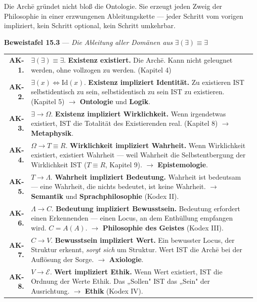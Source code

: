 \documentclass[10pt, openany, oneside]{book}
\renewcommand{\footnotesize}{\fontsize{8.5}{11}\selectfont}
\begin{document}
\vspace{0.5em}

\noindent Die Arch\={e} gründet nicht bloß die Ontologie. Sie erzeugt jeden Zweig der Philosophie in einer erzwungenen Ableitungskette --- jeder Schritt vom vorigen impliziert, kein Schritt optional, kein Schritt umkehrbar.

\vspace{0.3em}

\textbf{Beweistafel 15.3} --- \textit{Die Ableitung aller Domänen aus} $\exists(\exists) \equiv \exists$

\vspace{0.5em}

{\footnotesize
\noindent\begin{tabular}{r p{}}
\textbf{AK-1.} & $\exists(\exists) \equiv \exists$. \textbf{Existenz existiert.} Die Arch\={e}. Kann nicht geleugnet werden, ohne vollzogen zu werden. (Kapitel 4) \\[0.3em]
\textbf{AK-2.} & $\exists(x) \iff \text{Id}(x)$. \textbf{Existenz impliziert Identität.} Zu existieren IST selbstidentisch zu sein, selbstidentisch zu sein IST zu existieren. (Kapitel 5) $\to$ \textbf{Ontologie} und \textbf{Logik}. \\[0.3em]
\textbf{AK-3.} & $\exists \to \Omega$. \textbf{Existenz impliziert Wirklichkeit.} Wenn irgendetwas existiert, IST die Totalität des Existierenden real. (Kapitel 8) $\to$ \textbf{Metaphysik}. \\[0.3em]
\textbf{AK-4.} & $\Omega \to T \equiv R$. \textbf{Wirklichkeit impliziert Wahrheit.} Wenn Wirklichkeit existiert, existiert Wahrheit --- weil Wahrheit die Selbstentbergung der Wirklichkeit IST ($T \equiv R$, Kapitel 9). $\to$ \textbf{Epistemologie}. \\[0.3em]
\textbf{AK-5.} & $T \to \Lambda$. \textbf{Wahrheit impliziert Bedeutung.} Wahrheit ist bedeutsam --- eine Wahrheit, die nichts bedeutet, ist keine Wahrheit. $\to$ \textbf{Semantik} und \textbf{Sprachphilosophie} (Kodex II). \\[0.3em]
\textbf{AK-6.} & $\Lambda \to C$. \textbf{Bedeutung impliziert Bewusstsein.} Bedeutung erfordert einen Erkennenden --- einen Locus, an dem Enthüllung empfangen wird. $C = A(A)$. $\to$ \textbf{Philosophie des Geistes} (Kodex III). \\[0.3em]
\textbf{AK-7.} & $C \to V$. \textbf{Bewusstsein impliziert Wert.} Ein bewusster Locus, der Struktur erkennt, \textit{sorgt sich} um Struktur. Wert IST die Arch\={e} bei der Auflösung der Sorge. $\to$ \textbf{Axiologie}. \\[0.3em]
\textbf{AK-8.} & $V \to \mathcal{E}$. \textbf{Wert impliziert Ethik.} Wenn Wert existiert, IST die Ordnung der Werte Ethik. Das „Sollen" IST das „Sein" der Ausrichtung. $\to$ \textbf{Ethik} (Kodex IV). \\[0.3em]
\end{tabular}
}
\end{document}
